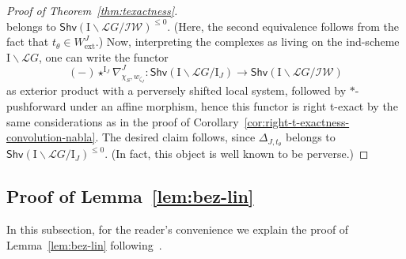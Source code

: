 \documentclass[11pt]{amsart}
\numberwithin{equation}{section}
\theoremstyle{plain}
\theoremstyle{definition}
\newcommand{\I}{{\mathrm I}}
\newcommand{\sL}{{\mathcal L}}
\newcommand{\X}{{\mathbb X}}
\newcommand{\Xd}{\check{\X}}
\newcommand{\oblv}{\mathrm{oblv}}
\newcommand{\Av}{\mathrm{Av}}
\newcommand{\IW}{\mathcal{IW}}
\newcommand{\ex}{\mathrm{ext}}
\newcommand{\Shv}{\mathsf{Shv}}
\newcommand{\comp}{\mathrm{c}}
\begin{document}
\begin{proof}[Proof of Theorem~\ref{thm:texactness}]
\[\]
belongs to $\Shv(\I\backslash \sL{G}/\IW)^{\leq 0}$. (Here, the second equivalence follows from the fact that $t_\theta \in W_\ex^J$.)
Now, interpreting the complexes as living on the ind-scheme $\I \backslash \sL G$, one can write the functor
\[
(-) \star^{\I_J} \nabla^J_{\chi_S,w_{\zeta_J}} : \Shv(\I \backslash \sL G / \I_J) \to \Shv(\I \backslash \sL G / \IW)
\]
as exterior product with a perversely shifted local system, followed by $*$-pushforward under an affine morphism, hence this functor is right t-exact by the same considerations as in the proof of Corollary~\ref{cor:right-t-exactness-convolution-nabla}. The desired claim follows, since $\Delta_{J,t_\theta}$ belongs to $\Shv(\I \backslash \sL G / \I_J)^{\leq 0}$. (In fact, this object is well known to be perverse.)
%
%
\end{proof}

\subsection{Proof of Lemma~\ref{lem:bez-lin}} 
\label{ss:pf-lem}

In this subsection, for the reader's convenience we explain the proof of Lemma~\ref{lem:bez-lin} following~\cite{BLin}.
\end{document}

